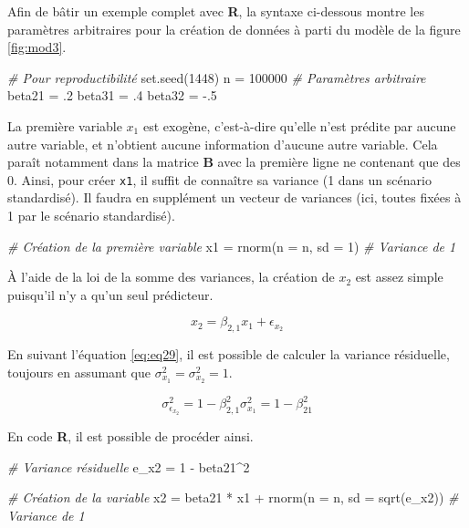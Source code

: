 \documentclass[
]{book}
\newenvironment{Shaded}{}{}
\newcommand{\AttributeTok}[1]{#1}
\newcommand{\CommentTok}[1]{\textit{#1}}
\newcommand{\DecValTok}[1]{#1}
\newcommand{\FunctionTok}[1]{#1}
\newcommand{\NormalTok}[1]{#1}
\newcommand{\OtherTok}[1]{#1}
\newcommand{\SpecialCharTok}[1]{#1}
\begin{document}
Afin de bâtir un exemple complet avec \textbf{R}, la syntaxe ci-dessous montre les paramètres arbitraires pour la création de données à parti du modèle de la figure \ref{fig:mod3}.

\begin{Shaded}
\begin{Highlighting}[]
\CommentTok{\# Pour reproductibilité}
\FunctionTok{set.seed}\NormalTok{(}\DecValTok{1448}\NormalTok{)            }
\NormalTok{n }\OtherTok{=} \DecValTok{100000}
\CommentTok{\# Paramètres arbitraire}
\NormalTok{beta21 }\OtherTok{=}\NormalTok{ .}\DecValTok{2} 
\NormalTok{beta31 }\OtherTok{=}\NormalTok{ .}\DecValTok{4}
\NormalTok{beta32 }\OtherTok{=} \SpecialCharTok{{-}}\NormalTok{.}\DecValTok{5}
\end{Highlighting}
\end{Shaded}

La première variable \(x_1\) est exogène, c'est-à-dire qu'elle n'est prédite par aucune autre variable, et n'obtient aucune information d'aucune autre variable. Cela paraît notamment dans la matrice \(\mathbf{B}\) avec la première ligne ne contenant que des 0. Ainsi, pour créer \texttt{x1}, il suffit de connaître sa variance (1 dans un scénario standardisé). Il faudra en supplément un vecteur de variances (ici, toutes fixées à 1 par le scénario standardisé).

\begin{Shaded}
\begin{Highlighting}[]
\CommentTok{\# Création de la première variable}
\NormalTok{x1 }\OtherTok{=} \FunctionTok{rnorm}\NormalTok{(}\AttributeTok{n =}\NormalTok{ n, }\AttributeTok{sd =} \DecValTok{1}\NormalTok{) }\CommentTok{\# Variance de 1}
\end{Highlighting}
\end{Shaded}

À l'aide de la loi de la somme des variances, la création de \(x_2\) est assez simple puisqu'il n'y a qu'un seul prédicteur.

\[
x_2 = \beta_{2,1}x_1+\epsilon_{x_2}
\]

En suivant l'équation \eqref{eq:eq29}, il est possible de calculer la variance résiduelle, toujours en assumant que \(\sigma^2_{x_1} = \sigma^2_{x_2}=1\).

\[
\sigma^2_{\epsilon_{x_2}} = 1-\beta_{2,1}^2\sigma^2_{x_1}=1-\beta_{21}^2
\]

En code \textbf{R}, il est possible de procéder ainsi.

\begin{Shaded}
\begin{Highlighting}[]
\CommentTok{\# Variance résiduelle}
\NormalTok{e\_x2 }\OtherTok{=} \DecValTok{1} \SpecialCharTok{{-}}\NormalTok{ beta21}\SpecialCharTok{\^{}}\DecValTok{2}

\CommentTok{\# Création de la variable}
\NormalTok{x2 }\OtherTok{=}\NormalTok{ beta21 }\SpecialCharTok{*}\NormalTok{ x1 }\SpecialCharTok{+} \FunctionTok{rnorm}\NormalTok{(}\AttributeTok{n =}\NormalTok{ n,  }\AttributeTok{sd =} \FunctionTok{sqrt}\NormalTok{(e\_x2)) }\CommentTok{\# Variance de 1}
\end{Highlighting}
\end{Shaded}
\end{document}
